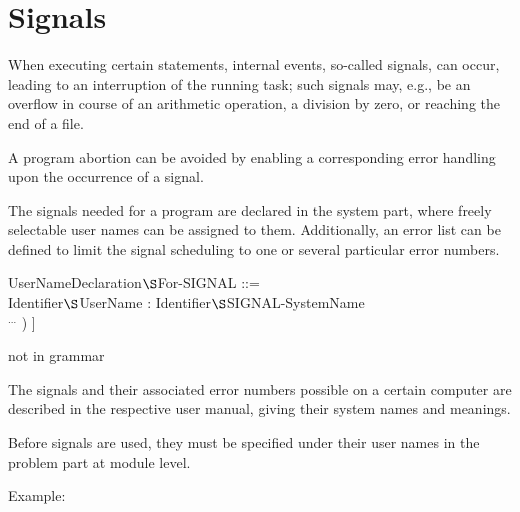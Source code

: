 \chapter{Signals}   %
\label{signals}

When executing certain statements, internal events, so-called signals,
can occur, leading to an interruption of the running task; such signals
may, e.g., be an overflow in course of an arithmetic operation, a
division by zero, or reaching the end of a file.

A program abortion can be avoided by enabling a corresponding error
handling upon the occurrence of a signal.

The signals needed for a program are declared in the system part, where
freely selectable user names can be assigned to them. Additionally, an
error list can be defined to limit the signal scheduling to one or
several particular error numbers.

\begin{front}
UserNameDeclaration$\S $For-SIGNAL ::= \\
\x Identifier$\S $UserName : Identifier$\S $SIGNAL-SystemName\\
\x \x [ ( Identifier$\S $ErrorNumber [ , Identifier$\S $ErrorNumber ] $^{...}$ ) ]
\end{front}
\begin{grammar}
not in grammar
\end{grammar}

The signals and their associated error numbers possible on a certain
computer are described in the respective user manual, giving their
system names and meanings.

Before signals are used, they must be specified under their user names
in the problem part at module level.

Example:


